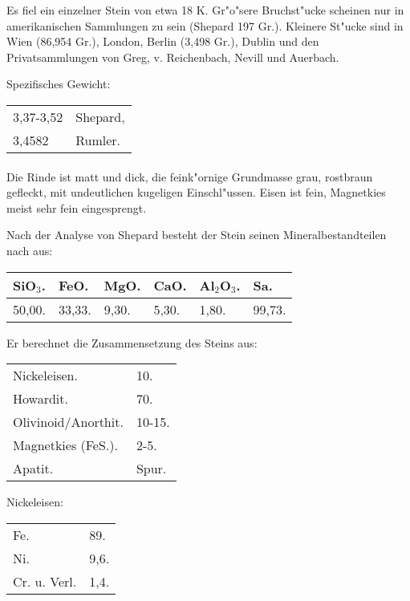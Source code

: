 \documentclass[a4paper, 11pt, oneside]{article}
\begin{document}
Es fiel ein einzelner Stein von etwa 18 K. Gr"o"sere Bruchst"ucke scheinen nur in amerikanischen Sammlungen zu sein (Shepard 197 Gr.). Kleinere St"ucke sind in Wien (86,954 Gr.), London, Berlin (3,498 Gr.), Dublin und den Privatsammlungen von Greg, v. Reichenbach, Nevill und Auerbach.

Spezifisches Gewicht:
\begin{table}[!ht]
    \centering
    \begin{tabular}{l l}
        3,37-3,52 & Shepard,\\
        3,4582 & Rumler.
    \end{tabular}
\end{table}
\paragraph{}
Die Rinde ist matt und dick, die feink"ornige Grundmasse grau, rostbraun gefleckt, mit undeutlichen kugeligen Einschl"ussen. Eisen ist fein, Magnetkies meist sehr fein eingesprengt.

Nach der Analyse von Shepard besteht der Stein seinen Mineralbestandteilen nach aus:
\begin{table}[!ht]
    \centering
    \begin{tabular}{l l l l l l}
        SiO$_{3}$. & FeO. & MgO. & CaO. & Al$_{2}$O$_{3}$. & Sa. \\ \hline
        50,00. & 33,33. & 9,30. & 5,30. & 1,80. & 99,73. \\
    \end{tabular}
\end{table}

Er berechnet die Zusammensetzung des Steins aus:
\begin{table}[H]
    \centering
    \begin{tabular}{l l}
        Nickeleisen. & 10. \\
        Howardit. & 70. \\
        Olivinoid/Anorthit. & 10-15. \\
        Magnetkies (FeS.). & 2-5.  \\
        Apatit. & Spur. \\
    \end{tabular}
\end{table}

Nickeleisen:
\begin{table}[H]
    \centering
    \begin{tabular}{l l}
        Fe. & 89. \\
        Ni. & 9,6. \\
        Cr. u. Verl. & 1,4. \\
    \end{tabular}
\end{table}
\end{document}
